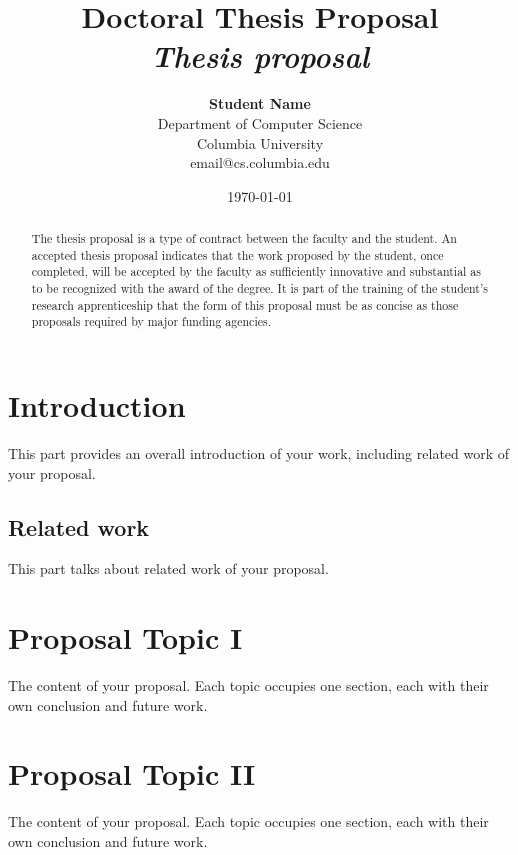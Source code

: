 \documentclass[12pt]{article}
\title{{\bf Doctoral Thesis Proposal} \\
\it Thesis proposal}
\author{ {\bf Student Name}  \\
Department of Computer Science \\
Columbia University\\
{\small email@cs.columbia.edu}
}
\date{\today}
\begin{document}
\pagestyle{plain}
\maketitle

\pagebreak
\begin{abstract}

The thesis proposal is a type of contract between the faculty and the student. 
An accepted thesis proposal indicates that the work proposed by the student, 
once completed, will be accepted by the faculty as sufficiently innovative and 
substantial as to be recognized with the award of the degree. It is part of 
the training of the student's research apprenticeship that the form of this 
proposal must be as concise as those proposals required by major funding 
agencies.

\end{abstract}

\pagebreak
\tableofcontents
\pagebreak

\cleardoublepage
{}

\section{Introduction}
\label{ch:intro}

This part provides an overall introduction of your work, including
related work of your proposal.

\subsection{Related work}
\label{ch:related}

This part talks about related work of your proposal.

\section{Proposal Topic I}
\label{ch:proposal}

The content of your proposal. Each topic occupies one section, each
with their own conclusion and future work.

\section{Proposal Topic II}
\label{ch:proposal}

The content of \cite{Huang2012} your proposal. Each topic occupies one section, each
with their own conclusion and future work.
\end{document}
